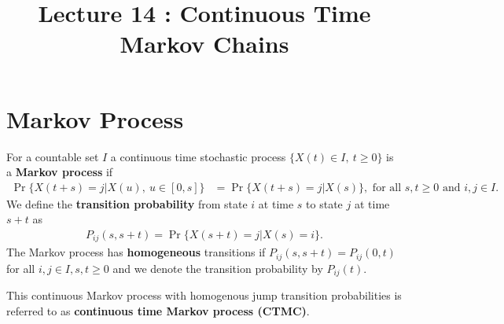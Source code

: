 \documentclass[a4paper,10pt,english]{article}
\title{Lecture 14 : Continuous Time Markov Chains}
\author{}
\begin{document}
\maketitle

\section{Markov Process}
\begin{defn}
For a countable set $I$ a continuous time stochastic process $\{X(t) \in I, ~ t \geqslant 0\}$ is a \textbf{Markov process} if
\begin{align*}
\Pr\{X(t+s) = j |X(u),~ u \in [0,s]\} &= \Pr\{X(t+s) = j |X(s)\}, \text{ for all } s, t \geqslant 0 \text{ and } i, j \in I.
\end{align*}
We define the \textbf{transition probability} from state $i$ at time $s$ to state $j$ at time $s+t$ as 
\begin{align*}
P_{ij}(s, s+t) = \Pr\{X(s+t) = j | X(s) = i\}.
\end{align*}
The Markov process has \textbf{homogeneous} transitions if $P_{ij}(s,s+t) = P_{ij}(0,t)$ for all $i,j \in I, s,t \geqslant 0$ and we denote the transition probability by $P_{ij}(t)$. 

This continuous Markov process with homogenous jump transition probabilities is referred to as \textbf{continuous time Markov process (CTMC)}.
\end{defn}
\end{document}
